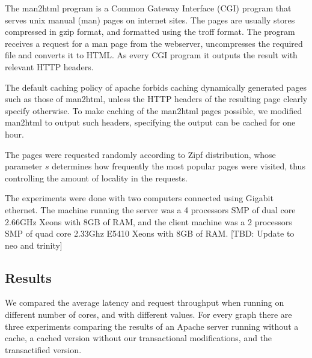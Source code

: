 \documentclass[preprint,natbib,11pt]{sigplanconf}
\begin{document}
The man2html program is a Common Gateway Interface (CGI) program that serves
unix manual (man) pages on internet sites. The pages are usually stores
compressed in gzip format, and formatted using the troff format. The program
receives a request for a man page from the webserver, uncompresses the required
file and converts it to HTML. As every CGI program it outputs the result with
relevant HTTP headers.

The default caching policy of apache forbids caching dynamically generated pages
such as those of man2html, unless the HTTP headers of the resulting page clearly
specify otherwise. To make caching of the man2html pages possible, we modified
man2html to output such headers, specifying the output can be cached for one
hour.

The pages were requested randomly according to Zipf distribution, whose
parameter $s$ determines how frequently the most popular pages were visited,
thus controlling the amount of locality in the requests.

The experiments were done with two computers connected using Gigabit ethernet.
The machine running the server was a 4 processors SMP of dual core 2.66GHz Xeons
with 8GB of RAM, and the client machine was a 2 processors SMP of quad core
2.33Ghz E5410 Xeons with 8GB of RAM. [TBD: Update to neo and trinity]

\subsection{Results} 
We compared the average latency and request throughput when running on different
number of cores, and with different  values. For every graph there are three
experiments comparing the results of an Apache server running without a cache, a
cached version without our transactional modifications, and the transactified
version. 
\end{document}

